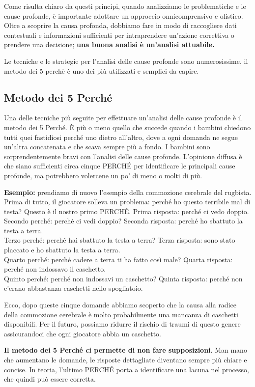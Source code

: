 Come risulta chiaro da questi principi, quando analizziamo le problematiche e le cause profonde, è importante adottare un approccio onnicomprensivo e olistico. Oltre a scoprire la causa profonda, dobbiamo fare in modo di raccogliere dati contestuali e informazioni sufficienti per intraprendere un'azione correttiva o prendere una decisione; \textbf{una buona analisi è un'analisi attuabile.}

Le tecniche e le strategie per l'analisi delle cause profonde sono numerosissime, il metodo dei 5 perchè è uno dei più utilizzati e semplici da capire.

\subsection{Metodo dei 5 Perché}
Una delle tecniche più seguite per effettuare un'analisi delle cause profonde è il metodo dei 5 Perché. È più o meno quello che succede quando i bambini chiedono tutti quei fastidiosi perché uno dietro all'altro, dove a ogni domanda ne segue un'altra concatenata e che scava sempre più a fondo. I bambini sono sorprendentemente bravi con l'analisi delle cause profonde. L'opinione diffusa è che siano sufficienti circa cinque PERCHÉ per identificare le principali cause profonde, ma potrebbero volercene un po' di meno o molti di più.

\textbf{Esempio:} prendiamo di nuovo l'esempio della commozione cerebrale del rugbista. \\

Prima di tutto, il giocatore solleva un problema: perché ho questo terribile mal di testa? Questo è il nostro primo PERCHÉ.
Prima risposta: perché ci vedo doppio.\\

Secondo perché: perché ci vedi doppio?
Seconda risposta: perché ho sbattuto la testa a terra.\\

Terzo perché: perché hai sbattuto la testa a terra?
Terza risposta: sono stato placcato e ho sbattuto la testa a terra.\\

Quarto perché: perché cadere a terra ti ha fatto così male?
Quarta risposta: perché non indossavo il caschetto.\\

Quinto perché: perché non indossavi un caschetto?
Quinta risposta: perché non c'erano abbastanza caschetti nello spogliatoio.

Ecco, dopo queste cinque domande abbiamo scoperto che la causa alla radice della commozione cerebrale è molto probabilmente una mancanza di caschetti disponibili. Per il futuro, possiamo ridurre il rischio di traumi di questo genere assicurandoci che ogni giocatore abbia un caschetto.

\textbf{Il metodo dei 5 Perché ci permette di non fare supposizioni}. Man mano che aumentano le domande, le risposte dettagliate diventano sempre più chiare e concise. In teoria, l'ultimo PERCHÉ porta a identificare una lacuna nel processo, che quindi può essere corretta.
